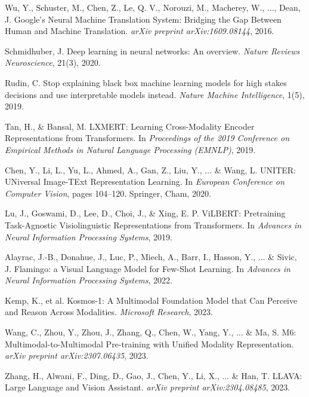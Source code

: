 \documentclass[conference]{IEEEtran}
\begin{document}
\begin{thebibliography}{999}
Wu, Y., Schuster, M., Chen, Z., Le, Q. V., Norouzi, M., Macherey, W., ..., Dean, J.
\newblock Google's Neural Machine Translation System: Bridging the Gap Between Human and Machine Translation.
\newblock \emph{arXiv preprint arXiv:1609.08144}, 2016.

Schmidhuber, J.
\newblock Deep learning in neural networks: An overview.
\newblock \emph{Nature Reviews Neuroscience}, 21(3), 2020.

Rudin, C.
\newblock Stop explaining black box machine learning models for high stakes decisions and use interpretable models instead.
\newblock \emph{Nature Machine Intelligence}, 1(5), 2019.

Tan, H., \& Bansal, M.
\newblock LXMERT: Learning Cross-Modality Encoder Representations from Transformers.
\newblock In \emph{Proceedings of the 2019 Conference on Empirical Methods in Natural Language Processing (EMNLP)}, 2019.

Chen, Y., Li, L., Yu, L., Ahmed, A., Gan, Z., Liu, Y., ... \& Wang, L.
\newblock UNITER: UNiversal Image-TExt Representation Learning.
\newblock In \emph{European Conference on Computer Vision}, pages 104–120. Springer, Cham, 2020.

Lu, J., Goswami, D., Lee, D., Choi, J., \& Xing, E. P.
\newblock ViLBERT: Pretraining Task-Agnostic Visiolinguistic Representations from Transformers.
\newblock In \emph{Advances in Neural Information Processing Systems}, 2019.

Alayrac, J.-B., Donahue, J., Luc, P., Miech, A., Barr, I., Hasson, Y., ... \& Sivic, J.
\newblock Flamingo: a Visual Language Model for Few-Shot Learning.
\newblock In \emph{Advances in Neural Information Processing Systems}, 2022.

Kemp, K., et al.
\newblock Kosmos-1: A Multimodal Foundation Model that Can Perceive and Reason Across Modalities.
\newblock \emph{Microsoft Research}, 2023.

Wang, C., Zhou, Y., Zhou, J., Zhang, Q., Chen, W., Yang, Y., ... \& Ma, S.
\newblock M6: Multimodal-to-Multimodal Pre-training with Unified Modality Representation.
\newblock \emph{arXiv preprint arXiv:2307.06435}, 2023.

Zhang, H., Alwani, F., Ding, D., Gao, J., Chen, Y., Li, X., ... \& Han, T.
\newblock LLAVA: Large Language and Vision Assistant.
\newblock \emph{arXiv preprint arXiv:2304.08485}, 2023.


\end{thebibliography}
\end{document}
